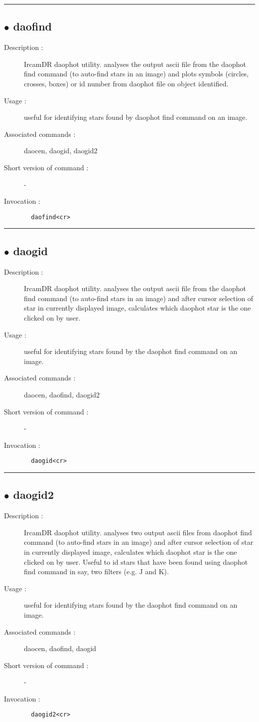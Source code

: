 \hrule \subsection*{$\bullet$ daofind}
\begin{description}
\item[Description :] IrcamDR daophot utility.  analyses the output ascii file from
the daophot find command (to auto-find stars in an image) and plots
symbols (circles, crosses, boxes) or id number from daophot file on
object identified.  
\item[Usage :] useful for identifying stars found by daophot find command on an
image.
\item[Associated commands :] daocen, daogid, daogid2
\item[Short version of command :] -
\item[Invocation :]

\verb+  daofind<cr> +\end{description}

\hrule \subsection*{$\bullet$ daogid}
\begin{description}
\item[Description :] IrcamDR daophot utility.  analyses the output ascii file from
the daophot find command (to auto-find stars in an image) and after
cursor selection of star in currently displayed image, calculates which
daophot star is the one clicked on by user.
\item[Usage :] useful for identifying stars found by the daophot find command on
an image.
\item[Associated commands :] daocen, daofind, daogid2
\item[Short version of command :] -
\item[Invocation :]

\verb+  daogid<cr> +\end{description}

\hrule \subsection*{$\bullet$ daogid2}
\begin{description}
\item[Description :] IrcamDR daophot utility.  analyses two output ascii files from
daophot find command (to auto-find stars in an image) and after cursor
selection of star in currently displayed image, calculates which daophot
star is the one clicked on by user.  Useful to id stars that have been 
found using daophot find command in say, two filters (e.g. J and K).
\item[Usage :] useful for identifying stars found by the daophot find command on
an image.
\item[Associated commands :] daocen, daofind, daogid
\item[Short version of command :] -
\item[Invocation :]

\verb+  daogid2<cr> +\end{description}

